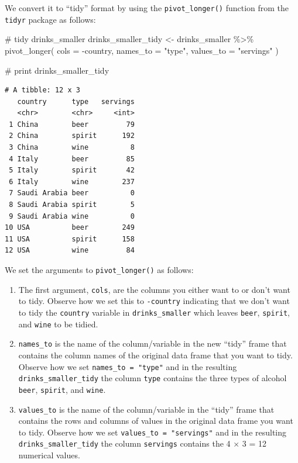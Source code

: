 \documentclass[
  letterpaper,
  DIV=11,
  numbers=noendperiod]{scrreprt}
\newenvironment{Shaded}{\begin{snugshade}}{\end{snugshade}}
\newcommand{\AttributeTok}[1]{\textcolor[rgb]{0.40,0.45,0.13}{#1}}
\newcommand{\CommentTok}[1]{\textcolor[rgb]{0.37,0.37,0.37}{#1}}
\newcommand{\FunctionTok}[1]{\textcolor[rgb]{0.28,0.35,0.67}{#1}}
\newcommand{\NormalTok}[1]{\textcolor[rgb]{0.00,0.23,0.31}{#1}}
\newcommand{\OtherTok}[1]{\textcolor[rgb]{0.00,0.23,0.31}{#1}}
\newcommand{\SpecialCharTok}[1]{\textcolor[rgb]{0.37,0.37,0.37}{#1}}
\newcommand{\StringTok}[1]{\textcolor[rgb]{0.13,0.47,0.30}{#1}}
\theoremstyle{definition}
\theoremstyle{remark}
\begin{document}
We convert it to ``tidy'' format by using the \texttt{pivot\_longer()}
function from the \texttt{tidyr} package as follows:

\begin{Shaded}
\begin{Highlighting}[]
\CommentTok{\# tidy drinks\_smaller}
\NormalTok{drinks\_smaller\_tidy }\OtherTok{\textless{}{-}}\NormalTok{ drinks\_smaller }\SpecialCharTok{\%\textgreater{}\%} 
  \FunctionTok{pivot\_longer}\NormalTok{(}
    \AttributeTok{cols =} \SpecialCharTok{{-}}\NormalTok{country, }
    \AttributeTok{names\_to =} \StringTok{"type"}\NormalTok{, }
    \AttributeTok{values\_to =} \StringTok{"servings"}
\NormalTok{  )}

\CommentTok{\# print}
\NormalTok{drinks\_smaller\_tidy}
\end{Highlighting}
\end{Shaded}

\begin{verbatim}
# A tibble: 12 x 3
   country      type   servings
   <chr>        <chr>     <int>
 1 China        beer         79
 2 China        spirit      192
 3 China        wine          8
 4 Italy        beer         85
 5 Italy        spirit       42
 6 Italy        wine        237
 7 Saudi Arabia beer          0
 8 Saudi Arabia spirit        5
 9 Saudi Arabia wine          0
10 USA          beer        249
11 USA          spirit      158
12 USA          wine         84
\end{verbatim}

We set the arguments to \texttt{pivot\_longer()} as follows:

\begin{enumerate}
\def\labelenumi{\arabic{enumi}.}
\item
  The first argument, \texttt{cols}, are the columns you either want to
  or don't want to tidy. Observe how we set this to \texttt{-country}
  indicating that we don't want to tidy the \texttt{country} variable in
  \texttt{drinks\_smaller} which leaves \texttt{beer}, \texttt{spirit},
  and \texttt{wine} to be tidied.
\item
  \texttt{names\_to} is the name of the column/variable in the new
  ``tidy'' frame that contains the column names of the original data
  frame that you want to tidy. Observe how we set
  \texttt{names\_to\ =\ "type"} and in the resulting
  \texttt{drinks\_smaller\_tidy} the column \texttt{type} contains the
  three types of alcohol \texttt{beer}, \texttt{spirit}, and
  \texttt{wine}.
\item
  \texttt{values\_to} is the name of the column/variable in the ``tidy''
  frame that contains the rows and columns of values in the original
  data frame you want to tidy. Observe how we set
  \texttt{values\_to\ =\ "servings"} and in the resulting
  \texttt{drinks\_smaller\_tidy} the column \texttt{servings} contains
  the 4 \(\times\) 3 = 12 numerical values.
\end{enumerate}
\end{document}
